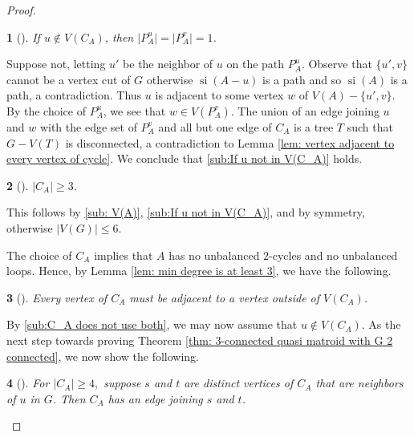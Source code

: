 \documentclass[12pt]{article}
\theoremstyle{definition}
\theoremstyle{plain} %
\newtheorem{subtheorem}{}[theorem]
\DeclareMathOperator{\si}{si}
\begin{document}
\begin{proof}
\begin{subtheorem}[{\cite[3.5.5]{Fife-Mayhew-Oxley-Semple2020}}]
    If $u \notin V(C_A)$, then $\lvert P_A^u\rvert=\lvert P_A^v\rvert=1$.
\end{subtheorem}
Suppose not, letting $u'$ be the neighbor of $u$ on the path $P^u_A$. Observe that $\{u',v\}$ cannot be a vertex cut of $G$ otherwise $\si(A-u)$ is a path and so $\si(A)$ is a path, a contradiction. Thus $u$ is adjacent to some vertex $w$ of $V(A)-\{u',v\}$. By the choice of $P^u_A$, we see that $w \in V(P^v_A)$. The union of an edge joining $u$ and $w$ with the edge set of $P^v_A$ and all but one edge of $C_A$ is a tree $T$ such that $G-V(T)$ is disconnected, a contradiction to Lemma \ref{lem: vertex adjacent to every vertex of cycle}. We conclude that \ref{sub:If u not in V(C_A)} holds.

\begin{subtheorem}[{\cite[3.5.6]{Fife-Mayhew-Oxley-Semple2020}}]\label{sub:C_A geq 3}
    $\lvert C_A\rvert\geq3$.
\end{subtheorem}
This follows by \ref{sub: V(A)}, \ref{sub:If u not in V(C_A)}, and by symmetry, otherwise $|V(G)| \leq 6$.

The choice of $C_A$ implies that $A$ has no unbalanced $2$-cycles and no unbalanced loops. Hence, by Lemma \ref{lem: min degree is at least 3}, we have the following.   

\begin{subtheorem}[{\cite[3.5.7]{Fife-Mayhew-Oxley-Semple2020}}]\label{sub: every vertex of C_A is adjacent}
    Every vertex of $C_A$ must be adjacent to a vertex outside of $V(C_A)$.
\end{subtheorem}
By \ref{sub:C_A does not use both}, we may now assume that $u \notin V(C_A)$. As the next step towards proving Theorem \ref{thm: 3-connected quasi matroid with G 2 connected}, we now show the following. 

\begin{subtheorem}[{\cite[3.5.8]{Fife-Mayhew-Oxley-Semple2020}}]\label{sub: C_A geq 4}
    For $\lvert  C_A\rvert\geq 4,$ suppose $s$ and $t$ are distinct vertices of $C_A$ that are neighbors of $u$ in $G$. Then $C_A$ has an edge joining $s$ and $t$.
\end{subtheorem}


\end{proof}
\end{document}
